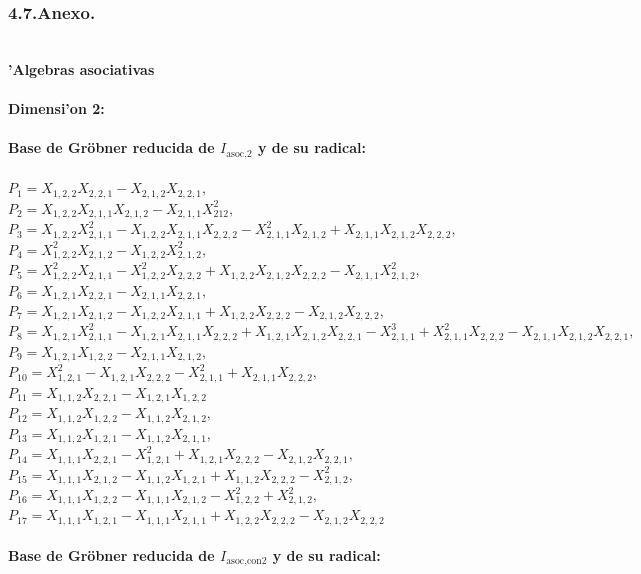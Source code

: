 \documentclass[10pt]{beamer}
\begin{document}
\begin{frame}
\frametitle{4.7.Anexo.}\\

\textbf{'Algebras asociativas}\\
\\
\textbf{Dimensi'on 2:}\\
\\
\textbf{Base de Gr\"obner reducida de $I_{\text{asoc,}2}$ y de su radical:}\\
\\
$P_1=X_{1,2,2}X_{2,2,1}-X_{2,1,2}X_{2,2,1},$\\
$P_2=X_{1,2,2}X_{2,1,1}X_{2,1,2}-X_{2,1,1}X_{212}^2,$\\
$P_3=X_{1,2,2}X_{2,1,1}^2-X_{1,2,2}X_{2,1,1}X_{2,2,2}-X_{2,1,1}^2X_{2,1,2}+X_{2,1,1}X_{2,1,2}X_{2,2,2},$\\
$P_4=X_{1,2,2}^2X_{2,1,2}-X_{1,2,2}X_{2,1,2}^2,$\\
$P_{5}=X_{1,2,2}^2X_{2,1,1}-X_{1,2,2}^2X_{2,2,2}+X_{1,2,2}X_{2,1,2}X_{2,2,2}-X_{2,1,1}X_{2,1,2}^2,$\\
$P_{6}=X_{1,2,1}X_{2,2,1}-X_{2,1,1}X_{2,2,1},$\\
$P_{7}=X_{1,2,1}X_{2,1,2}-X_{1,2,2}X_{2,1,1}+X_{1,2,2}X_{2,2,2}-X_{2,1,2}X_{2,2,2},$\\
$P_{8}=X_{1,2,1}X_{2,1,1}^2-X_{1,2,1}X_{2,1,1}X_{2,2,2}+X_{1,2,1}X_{2,1,2}X_{2,2,1}-X_{2,1,1}^3+X_{2,1,1}^2X_{2,2,2}-X_{2,1,1}X_{2,1,2}X_{2,2,1},$\\
$P_{9}=X_{1,2,1}X_{1,2,2}-X_{2,1,1}X_{2,1,2},$\\
$P_{10}=X_{1,2,1}^2-X_{1,2,1}X_{2,2,2}-X_{2,1,1}^2+X_{2,1,1}X_{2,2,2},$\\
$P_{11}=X_{1,1,2}X_{2,2,1}-X_{1,2,1}X_{1,2,2}$\\
$P_{12}=X_{1,1,2}X_{1,2,2}-X_{1,1,2}X_{2,1,2},$\\
$P_{13}=X_{1,1,2}X_{1,2,1}-X_{1,1,2}X_{2,1,1},$\\
$P_{14}=X_{1,1,1}X_{2,2,1}-X_{1,2,1}^2+X_{1,2,1}X_{2,2,2}-X_{2,1,2}X_{2,2,1},$\\
$P_{15}=X_{1,1,1}X_{2,1,2}-X_{1,1,2}X_{1,2,1}+X_{1,1,2}X_{2,2,2}-X_{2,1,2}^2,$\\
$P_{16}=X_{1,1,1}X_{1,2,2}-X_{1,1,1}X_{2,1,2}-X_{1,2,2}^2+X_{2,1,2}^2,$\\
$P_{17}=X_{1,1,1}X_{1,2,1}-X_{1,1,1}X_{2,1,1}+X_{1,2,2}X_{2,2,2}-X_{2,1,2}X_{2,2,2}$\\
\\
\textbf{Base de Gr\"obner reducida de $I_{\text{asoc,con}2}$ y de su radical:}\\

\end{frame}
\end{document}
